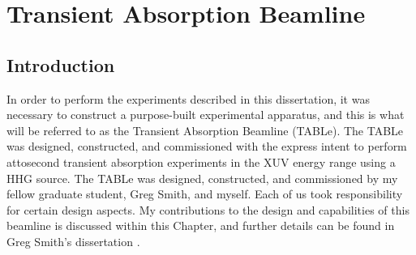 \chapter{Transient Absorption Beamline}
\label{chap:beamline}

\section{Introduction}
\label{intro_beamline}
In order to perform the experiments described in this dissertation, it was necessary to construct a purpose-built experimental apparatus, and this is what will be referred to as the Transient Absorption Beamline (TABLe).  The TABLe was designed, constructed, and commissioned with the express intent to perform attosecond transient absorption experiments in the XUV energy range using a HHG source.  The TABLe was designed, constructed, and commissioned by my fellow graduate student, Greg Smith, and myself. Each of us took responsibility for certain design aspects.  My contributions to the design and capabilities of this beamline is discussed within this Chapter, and further details can be found in Greg Smith's dissertation \cite{smithApplicationAttosecondTechniques2020}.

